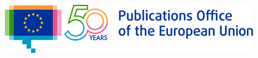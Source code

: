 \begin{titlepage}
\begin{center}

	\begin{center}
	\begin{center}
		\setlength{\tabcolsep}{0pt}
		\includegraphics[width=0.35\linewidth]{images/logos/OP-50years-EN}
	\end{center}


	\vspace{2mm}

	\end{center}
  	\vspace{5cm}
	\textbf{{\large \DelInitiative\\}}
	\vspace{2cm}
  
  	\begin{spacing}{2.5}
	    \textbf{\Huge \DelTitle}\\ \vspace{2cm}
  	\end{spacing}
  
  
  
  \vspace*{\fill}  
   
  

\end{center}
\end{titlepage}

